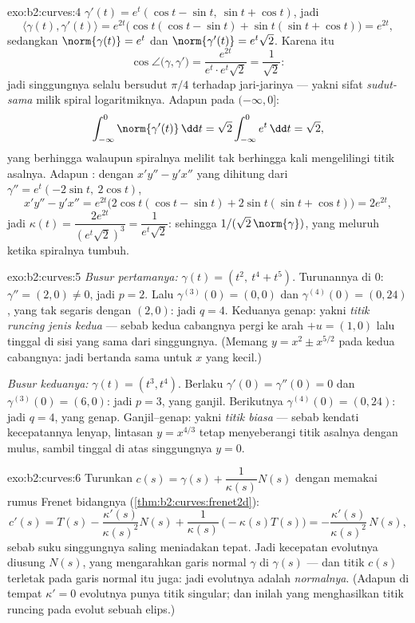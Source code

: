 \begin{solution}{exo:b2:curves:4}
$\gamma'(t) = e^t(\cos t - \sin t,\ \sin t + \cos t)$, jadi
\[
\langle \gamma(t), \gamma'(t)\rangle = e^{2t}
\bigl(\cos t(\cos t - \sin t) + \sin t(\sin t + \cos t)\bigr)
= e^{2t},
\]
sedangkan $\norm{\gamma(t)} = e^t$ dan $\norm{\gamma'(t)} =
e^t\sqrt 2$. Karena itu
\[
\cos\angle\bigl(\gamma, \gamma'\bigr)
= \frac{e^{2t}}{e^t \cdot e^t\sqrt2} = \frac{1}{\sqrt2} :
\]
jadi singgungnya selalu bersudut $\pi/4$ terhadap jari-jarinya --- yakni
sifat \emph{sudut-sama} milik spiral logaritmiknya. Adapun 
pada $(-\infty, 0]$:
\[
\int_{-\infty}^0 \norm{\gamma'(t)}\,\dd t
= \sqrt2\int_{-\infty}^0 e^t\,\dd t = \sqrt 2 ,
\]
yang berhingga walaupun spiralnya melilit tak berhingga kali mengelilingi
titik asalnya. Adapun : dengan $x'y'' - y'x''$ yang dihitung dari $\gamma'' =
e^t(-2\sin t,\ 2\cos t)$,
\[
x'y'' - y'x'' = e^{2t}\bigl(2\cos t(\cos t - \sin t)
+ 2\sin t(\sin t + \cos t)\bigr) = 2e^{2t},
\]
jadi $\kappa(t) = \dfrac{2e^{2t}}{(e^t\sqrt2)^3} =
\dfrac{1}{e^t\sqrt2}$: sehingga  $1/(\sqrt2\,
\norm{\gamma})$, yang meluruh ketika spiralnya tumbuh.
\end{solution}

\begin{solution}{exo:b2:curves:5}
\emph{Busur pertamanya:} $\gamma(t) = (t^2,\ t^4 + t^5)$. Turunannya di
$0$: $\gamma'' = (2, 0) \neq 0$, jadi $p = 2$. Lalu $\gamma^{(3)}(0)
= (0, 0)$ dan $\gamma^{(4)}(0) = (0, 24)$, yang tak segaris dengan $(2,
0)$: jadi $q = 4$. Keduanya genap: yakni \emph{titik runcing jenis kedua} --- sebab kedua
cabangnya pergi ke arah $+u = (1,0)$ lalu tinggal di sisi yang sama
dari singgungnya. (Memang $y = x^2 \pm x^{5/2}$ pada kedua
cabangnya: jadi bertanda sama untuk $x$ yang kecil.)

\emph{Busur keduanya:} $\gamma(t) = (t^3, t^4)$. Berlaku $\gamma'(0) =
\gamma''(0) = 0$ dan $\gamma^{(3)}(0) = (6, 0)$: jadi $p = 3$, yang ganjil. Berikutnya
$\gamma^{(4)}(0) = (0, 24)$: jadi $q = 4$, yang genap. Ganjil--genap:
yakni \emph{titik biasa} --- sebab kendati kecepatannya lenyap,
lintasan $y = x^{4/3}$ tetap menyeberangi titik asalnya dengan mulus, sambil tinggal
di atas singgungnya $y = 0$.
\end{solution}

\begin{solution}{exo:b2:curves:6}
Turunkan $c(s) = \gamma(s) + \dfrac{1}{\kappa(s)}N(s)$ dengan memakai
rumus Frenet bidangnya
(\cref{thm:b2:curves:frenet2d}):
\[
c'(s) = T(s) - \frac{\kappa'(s)}{\kappa(s)^2}N(s)
+ \frac{1}{\kappa(s)}\,\bigl(-\kappa(s)T(s)\bigr)
= -\frac{\kappa'(s)}{\kappa(s)^2}\,N(s) ,
\]
sebab suku singgungnya saling meniadakan tepat. Jadi kecepatan
evolutnya diusung $N(s)$, yang mengarahkan garis normal
$\gamma$ di $\gamma(s)$ --- dan titik $c(s)$ terletak pada
garis normal itu juga: jadi evolutnya adalah \emph{ normalnya}.
(Adapun di tempat $\kappa' = 0$ evolutnya punya titik singular; dan inilah
yang menghasilkan titik runcing pada evolut sebuah elips.)
\end{solution}

